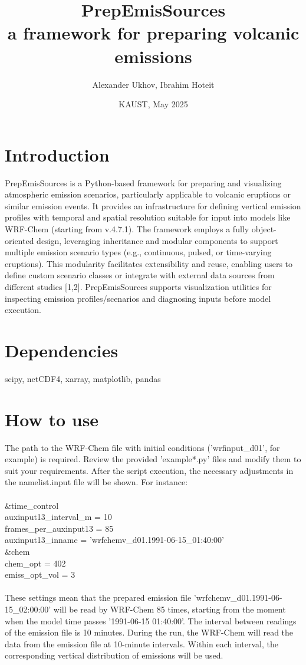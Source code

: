 \documentclass{article}
\title{PrepEmisSources \\ a framework for preparing volcanic emissions}
\author{Alexander Ukhov, Ibrahim Hoteit}
\date{KAUST, May 2025}
\begin{document}
\maketitle

\section{Introduction}
PrepEmisSources is a Python-based framework for preparing and visualizing atmospheric emission scenarios, particularly applicable to volcanic eruptions or similar emission events. It provides an infrastructure for defining vertical emission profiles with temporal and spatial resolution suitable for input into models like WRF-Chem (starting from v.4.7.1). The framework employs a fully object-oriented design, leveraging inheritance and modular components to support multiple emission scenario types (e.g., continuous, pulsed, or time-varying eruptions). This modularity facilitates extensibility and reuse, enabling users to define custom scenario classes or integrate with external data sources from different studies [1,2]. PrepEmisSources supports visualization utilities for inspecting emission profiles/scenarios and diagnosing inputs before model execution. 

\section{Dependencies}

scipy, netCDF4, xarray, matplotlib, pandas

\section{How to use}
The path to the WRF-Chem file with initial conditions ('wrfinput\_d01', for example) is required. Review the provided 'example*.py' files and modify them to suit your requirements. After the script execution, the necessary adjustments in the namelist.input file will be shown. For instance: \\ \\
    \&time\_control  \\
        auxinput13\_interval\_m = 10 \\
        frames\_per\_auxinput13 = 85 \\
        auxinput13\_inname     = 'wrfchemv\_d01.1991-06-15\_01:40:00' \\
    \&chem \\
        chem\_opt               = 402   \\
        emiss\_opt\_vol          = 3    \\ \\
These settings mean that the prepared emission file 'wrfchemv\_d01.1991-06-15\_02:00:00' will be read by WRF-Chem 85 times, starting from the moment when the model time passes '1991-06-15 01:40:00'. The interval between readings of the emission file is 10 minutes. During the run, the WRF-Chem will read the data from the emission file at 10-minute intervals. Within each interval, the corresponding vertical distribution of emissions will be used.
\end{document}
